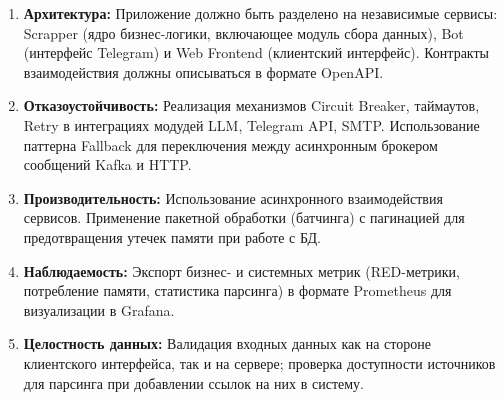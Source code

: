 \begin{enumerate}

\item \textbf{Архитектура:} Приложение должно быть разделено на независимые сервисы: Scrapper (ядро бизнес-логики, включающее модуль сбора данных), Bot (интерфейс Telegram) и Web Frontend (клиентский интерфейс). 
Контракты взаимодействия должны описываться в формате OpenAPI.

\item \textbf{Отказоустойчивость:} Реализация механизмов Circuit Breaker, таймаутов, Retry в интеграциях модудей LLM, Telegram API, SMTP. 
Использование паттерна Fallback для переключения между асинхронным брокером сообщений Kafka и HTTP.

\item \textbf{Производительность:} Использование асинхронного взаимодействия сервисов. Применение пакетной обработки (батчинга) с пагинацией для предотвращения утечек памяти при работе с БД.

\item \textbf{Наблюдаемость:} Экспорт бизнес- и системных метрик (RED-метрики, потребление памяти, статистика парсинга) в формате Prometheus для визуализации в Grafana.

\item \textbf{Целостность данных:} Валидация входных данных как на стороне клиентского интерфейса, так и на сервере; проверка доступности источников для парсинга при добавлении ссылок на них в систему.

\end{enumerate}
